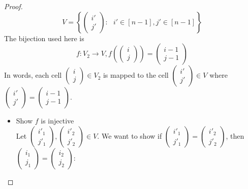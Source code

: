 \begin{proof}
\begin{equation*}
    V = \left \{ \begin{pmatrix} i' \\ j' \end{pmatrix} : \text{ } i' \in [n-1], j' \in [n-1]\right \}
\end{equation*}
The bijection used here is 
\begin{equation*}
    f:V_2 \xrightarrow{} V, f\left(\begin{pmatrix} i \\ j \end{pmatrix}\right) = \begin{pmatrix} i-1 \\ j-1 \end{pmatrix}
\end{equation*}
In words, each cell $\begin{pmatrix} i \\ j \end{pmatrix}\in V_2$ is mapped to the cell $\begin{pmatrix} i' \\ j' \end{pmatrix}\in V$ where $\begin{pmatrix} i' \\ j' \end{pmatrix} = \begin{pmatrix} i-1 \\ j-1 \end{pmatrix}$.
\begin{itemize}
    \item Show $f$ is injective \\
    Let $\begin{pmatrix} i'_1 \\ j'_1 \end{pmatrix}, \begin{pmatrix} i'_2 \\ j'_2 \end{pmatrix}\in V$. We want to show if $\begin{pmatrix} i'_1 \\ j'_1 \end{pmatrix} = \begin{pmatrix} i'_2 \\ j'_2\end{pmatrix}$, then $\begin{pmatrix} i_1 \\ j_1 \end{pmatrix} = \begin{pmatrix} i_2 \\ j_2 \end{pmatrix}$:

\end{itemize}
\end{proof}
